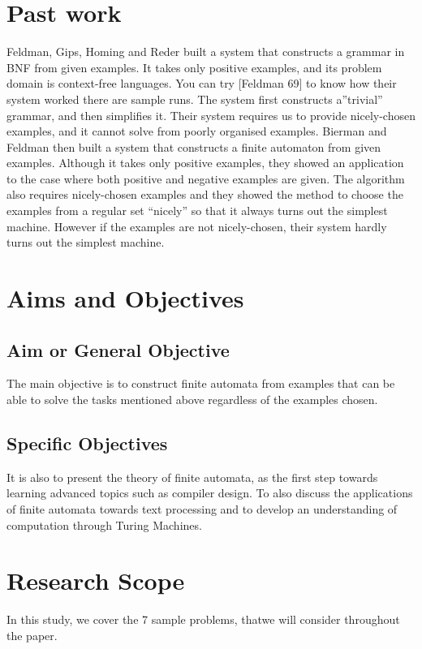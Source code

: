 \documentclass[14pt]{article}
\begin{document}
\section{Past work}
Feldman, Gips, Homing and Reder built a system that constructs a grammar in BNF from given examples. It takes only positive examples, and its problem domain is context-free languages.
You can try [Feldman 69] to know how their system worked there are sample runs.
The system first constructs a”trivial” grammar, and then simplifies it. Their system requires us to provide nicely-chosen examples, and it cannot solve from poorly organised examples.
Bierman and Feldman then built a system that constructs a finite automaton from given examples. Although it takes only positive examples, they showed an application to the case where both positive and negative examples are given. The algorithm also requires nicely-chosen examples and they showed the method to choose the examples from a regular set “nicely” so that it always turns out the simplest machine. However if the examples are not nicely-chosen, their system hardly turns out the simplest machine.

\section{Aims and Objectives}
\subsection{Aim or General Objective}
The main objective is to construct finite automata from examples that can be able to solve the tasks mentioned above regardless of the examples chosen.
\subsection{Specific Objectives}
 It is also to present the theory of finite automata, as the first step towards learning advanced topics such as compiler  
design. To also discuss the applications of finite automata towards text processing and to develop an understanding of computation through Turing Machines.
\section{Research Scope}
In this study, we cover the 7 sample problems, thatwe will consider throughout the paper.
\end{document}
